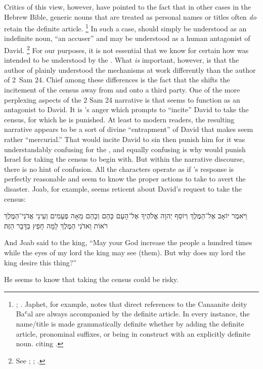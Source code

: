  Critics of this view, however, have pointed to the fact that in other cases in the Hebrew Bible, generic nouns that are treated as personal names or titles often \emph{do} retain the definite article.%
    \footnote{\Cite[114--117]{japhet2009};
        \cite[370--390]{japhet1993}. Japhet, for example, notes that direct references to the Canaanite deity Baʿal are always accompanied by the definite article. In every instance, the name/title  is made grammatically definite whether by adding the definite article, pronominal suffixes, or being in construct with an explicitly definite noun. 
        \cite[115]{japhet2009} citing 
        \cite[§126d]{gkc}.}
In such a case,  should simply be understood as an indefinite noun, ``an accuser'' and may be understood as a human antagonist of David.%
    \footnote{See 
        \cite{stokes_jbl2009};
        \cite[114--117]{japhet2009}; 
        \cite[370--390]{japhet1993}.} 
For our purposes, it is not essential that we know for certain how  was intended to be understood by the \chronicler. What \emph{is} important, however, is that the author of \chronicles plainly understood the mechanisms at work differently than the author of 2~Sam 24. Chief among these differences is the fact that the \chronicler shifts the incitement of the census away from \yahweh and onto a third party. One of the more perplexing aspects of the 2 Sam 24 narrative is that \yahweh seems to function as an antagonist to David. It is \yahweh's anger which prompts \yahweh to ``incite'' David to take the census, for which he is punished. At least to modern readers, the resulting narrative appears to be a sort of divine ``entrapment'' of David that makes \yahweh seem rather ``mercurial.''%
    \autocite[4]{rollston_keith-stuckenbruck2016}
That \yahweh would incite David to sin then punish him for it was understandably confusing for the \chronicler, and equally confusing is why \yahweh would punish Israel for taking the census to begin with. But within the narrative discourse, there is no hint of confusion. All the characters operate as if \yahweh's response is perfectly reasonable and seem to know the proper actions to take to avert the disaster. Joab, for example, seems reticent about David's request to take the census:
\begin{hebrewtext}
    וַיֹּאמֶר יוֹאָב אֶל־הַמֶּלֶךְ וְיוֹסֵף יְהוָה אֱלֹהֶיךָ אֶל־הָעָם כָּהֵם וְכָהֵם מֵאָה פְעָמִים וְעֵינֵי אֲדֹנִי־הַמֶּלֶךְ רֹאוֹת וַאדֹנִי הַמֶּלֶךְ לָמָּה חָפֵץ בַּדָּבָר הַזֶּה׃
\end{hebrewtext}
\begin{translation}
    And Joab said to the king, ``May \yahweh your God increase the people a hundred times while the eyes of my lord the king may see (them). But why does my lord the king desire this thing?''
\end{translation}
\noindent
He seems to know that taking the census could be risky. 

